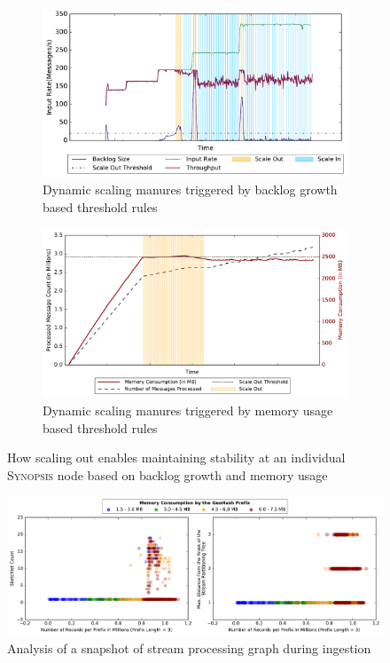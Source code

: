 \begin{figure}
    \begin{subfigure}{0.48\textwidth}
            \centering
            \includegraphics[scale=0.42]{figures/stability_partial.pdf}
            \caption{Dynamic scaling manures triggered by backlog growth based threshold rules}
            \label{fig:stability-backlog}
    \end{subfigure}
    \begin{subfigure}{0.48\textwidth}
            \centering
            \includegraphics[scale=0.42]{figures//mem_stability.pdf} 
            \caption{Dynamic scaling manures triggered by memory usage based threshold rules}
            \label{fig:stability-mem}
    \end{subfigure}
    \caption{How scaling out enables maintaining stability at an individual \textsc{Synopsis} node based on backlog growth and memory usage}
    \label{fig:system-stability}
\end{figure}

\begin{figure}
    \centerline{\includegraphics[width=\linewidth]{figures/scaleout_graph_analysis.pdf}}
    \caption{Analysis of a snapshot of stream processing graph during ingestion}
    \label{fig:scaleout-graph-analysis}
\end{figure}

